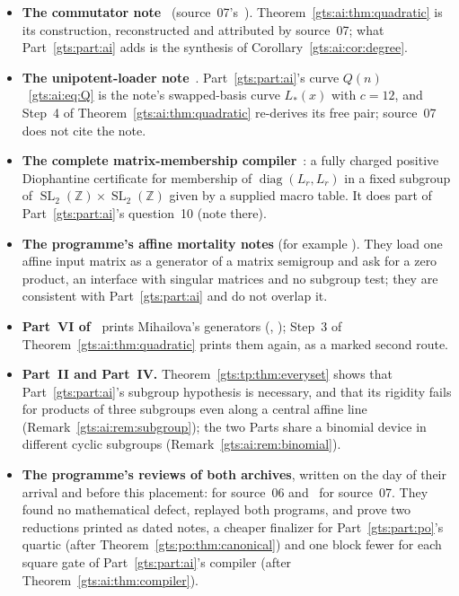 \documentclass[11pt,letterpaper]{article}
\theoremstyle{definition}
\theoremstyle{remark}
\newcommand{\Z}{\mathbb Z}
\newcommand{\SL}{\operatorname{SL}}
\newcommand{\diag}{\operatorname{diag}}
\begin{document}
\begin{itemize}
\item \textbf{The commutator note}~\cite{repo-comm} (source~07's~\cite{ai-repoquadratic}). Theorem~\ref{gts:ai:thm:quadratic} is its construction, reconstructed and attributed by source~07; what Part~\ref{gts:part:ai} adds is the synthesis of Corollary~\ref{gts:ai:cor:degree}.
\item \textbf{The unipotent-loader note}~\cite{repo-unip}. Part~\ref{gts:part:ai}'s curve $Q(n)$~\eqref{gts:ai:eq:Q} is the note's swapped-basis curve $L_*(x)$ with $c=12$, and Step~4 of Theorem~\ref{gts:ai:thm:quadratic} re-derives its free pair; source~07 does not cite the note.
\item \textbf{The complete matrix-membership compiler}~\cite{repo-cmc}: a fully charged positive Diophantine certificate for membership of $\diag(L_r,L_r)$ in a fixed subgroup of $\SL_2(\Z)\times\SL_2(\Z)$ given by a supplied macro table. It does part of Part~\ref{gts:part:ai}'s question~10 (note there).
\item \textbf{The programme's affine mortality notes} (for example ). They load one affine input matrix as a generator of a matrix semigroup and ask for a zero product, an interface with singular matrices and no subgroup test; they are consistent with Part~\ref{gts:part:ai} and do not overlap it.
\item \textbf{Part~VI of~\cite{pqc}} prints Mihailova's generators (, ); Step~3 of Theorem~\ref{gts:ai:thm:quadratic} prints them again, as a marked second route.
\item \textbf{Part~II and Part~IV.} Theorem~\ref{gts:tp:thm:everyset} shows that Part~\ref{gts:part:ai}'s subgroup hypothesis is necessary, and that its rigidity fails for products of three subgroups even along a central affine line (Remark~\ref{gts:ai:rem:subgroup}); the two Parts share a binomial device in different cyclic subgroups (Remark~\ref{gts:ai:rem:binomial}).
\item \textbf{The programme's reviews of both archives}, written on the day of their arrival and before this placement: \cite{repo-rev808} for source~06 and~\cite{repo-revaffine} for source~07. They found no mathematical defect, replayed both programs, and prove two reductions printed as dated notes, a cheaper finalizer for Part~\ref{gts:part:po}'s quartic (after Theorem~\ref{gts:po:thm:canonical}) and one block fewer for each square gate of Part~\ref{gts:part:ai}'s compiler (after Theorem~\ref{gts:ai:thm:compiler}).
\end{itemize}
\end{document}
